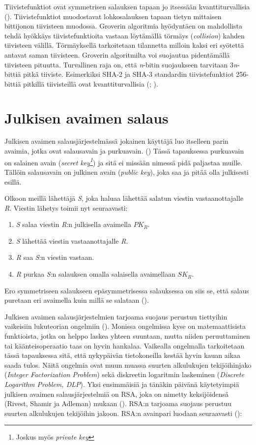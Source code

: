  Tiivistefunktiot ovat symmetrisen salauksen tapaan jo itsessään kvanttiturvallisia (\cite{mavroeidis2018impact}). Tiivistefunktiot muodostavat lohkosalauksen tapaan tietyn mittaisen bittijonon tiivisteen muodossa. Groverin algoritmia hyödyntäen on mahdollista tehdä hyökkäys tiivistefunktioita vastaan löytämällä törmäys (\emph{collision}) kahden tiivisteen välillä. Törmäyksellä tarkoitetaan tilannetta milloin kaksi eri syötettä antavat saman tiivisteen. %
 Groverin algoritmilta voi suojautua pidentämällä tiivisteen pituutta. Turvallinen raja on, että \emph{n}-bitin suojaukseen tarvitaan 3\emph{n}-bittiä pitkä tiiviste. Esimerkiksi SHA-2 ja SHA-3 standardin tiivistefunktiot 256-bittiä pitkillä tiivisteillä ovat kvanttiturvallisia (\cite{mavroeidis2018impact}; \cite{buchmann2016post}).
 
 \section{Julkisen avaimen salaus}
 Julkisen avaimen salausjärjestelmässä jokainen käyttäjä luo itselleen parin avaimia, jotka ovat salausavain ja purkuavain. (\cite{bellare2005introduction}) Tässä tapauksessa purkuavain on salainen avain (\emph{secret key\footnote{Joskus myös \emph{private key}}}) ja sitä ei missään nimessä pidä paljastaa muille. Tällöin salausavain on julkinen avain (\emph{public key}), joka saa ja pitää olla julkisesti esillä.
 
 Olkoon meillä lähettäjä \emph{S}, joka haluaa lähettää salatun viestin vastaanottajalle \emph{R}. Viestin lähetys toimii nyt seuraavasti:
 \begin{enumerate}
     \item \emph{S} salaa viestin \emph{R}:n julkisella avaimella $PK_{R}$.
     \item \emph{S} lähettää viestin vastaanottajalle \emph{R}.
     \item \emph{R} saa \emph{S}:n viestin vastaan.
     \item \emph{R} purkaa \emph{S}:n salauksen omalla salaisella avaimellaan $SK_{R}$.
 \end{enumerate}
Ero symmetriseen salaukseen epäsymmetrisessa salauksessa on siis se, että salaus puretaan eri avaimella kuin millä se salataan (\cite{bellare2005introduction}).
 
  Julkisen avaimen salausjärjestelmien tarjoama suojaus perustuu tiettyihin vaikeisiin lukuteorian ongelmiin (\cite{mavroeidis2018impact}). Monissa ongelmissa kyse on matemaattisista funktioista, jotka on helppo laskea yhteen suuntaan, mutta niiden peruuttaminen tai käänteisoperaatio taas on hyvin hankalaa. Vaikealla ongelmalla tarkoitetaan tässä tapauksessa sitä, että nykypäivän tietokoneilla kestää hyvin kauan aikaa saada tulos. Näitä ongelmia ovat muun muassa suurten alkulukujen tekijöihinjako (\emph{Integer Factorization Problem}) sekä diskreetin logaritmin laskeminen (\emph{Discrete Logarithm Problem, DLP}).
  Yksi ensimmäisiä ja tänäkin päivänä käytetyimpiä julkisen avaimen salausjärjestelmiä on RSA, joka on nimetty keksijöidensä (Rivest, Shamir ja Adleman) mukaan (\cite{montgomery1994survey}). RSA:n tarjoama suojaus perustuu suurten alkulukujen tekijöihin jakoon. RSA:n avainpari luodaan seuraavasti  (\cite{10.1145/359340.359342}):
  
